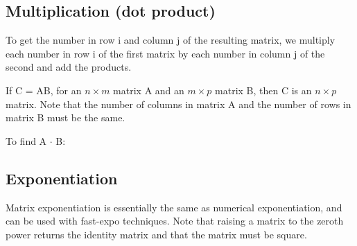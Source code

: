 \subsection*{Multiplication (dot product)}

To get the number in row i and column j of the resulting matrix, we multiply each number in row i of the first matrix by each number in column j of the second and add the products.

If C = AB, for an $n \times m$ matrix A and an $m \times p$ matrix B, then C is an $n \times p$ matrix. Note that the number of columns in matrix A and the number of rows in matrix B must be the same.

To find A $\cdot$ B:



\subsection*{Exponentiation}

Matrix exponentiation is essentially the same as numerical exponentiation, and can be used with fast-expo techniques. Note that raising a matrix to the zeroth power returns the identity matrix and that the matrix must be square.



\newpage